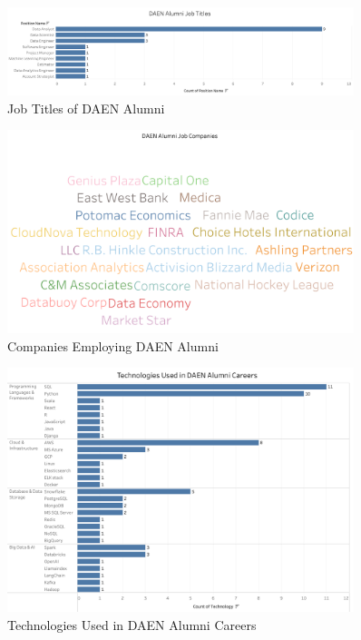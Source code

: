 \documentclass[12pt,a4paper]{article}
\begin{document}
\begin{figure}[H]
    \centering
    \includegraphics[width=0.9\textwidth]{visualizations/job-titles.png}
    \caption{Job Titles of DAEN Alumni}
    \label{fig:job-titles}
\end{figure}

\begin{figure}[H]
    \centering
    \includegraphics[width=0.9\textwidth]{visualizations/job-companies.png}
    \caption{Companies Employing DAEN Alumni}
    \label{fig:job-companies}
\end{figure}

\begin{figure}[H]
    \centering
    \includegraphics[width=0.9\textwidth]{visualizations/career-technologies.png}
    \caption{Technologies Used in DAEN Alumni Careers}
    \label{fig:career-technologies}
\end{figure}
\end{document}
